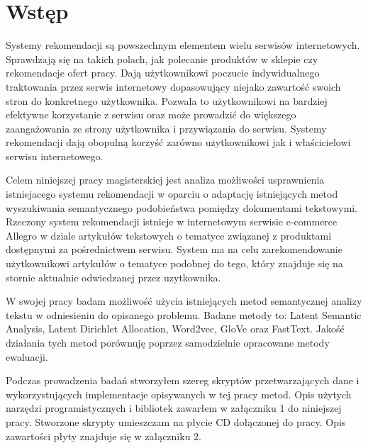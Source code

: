 \documentclass[pl]{minipw} %
\begin{document}
\makestatement


\cleardoublepage
\tableofcontents


\cleardoublepage
\pagestyle{fancy}

\chapter*{Wstęp}
Systemy rekomendacji są powszechnym elementem wielu serwisów internetowych. Sprawdzają się na takich polach, jak polecanie produktów w sklepie czy rekomendacje ofert pracy. Dają użytkownikowi poczucie indywidualnego traktowania przez serwis internetowy dopasowujący niejako zawartość swoich stron do konkretnego użytkownika. Pozwala to użytkownikowi na bardziej efektywne korzystanie z serwisu oraz może prowadzić do większego zaangażowania ze strony użytkownika i przywiązania do serwisu. Systemy rekomendacji dają obopulną korzyść zarówno użytkownikowi jak i właścicielowi serwisu internetowego.

Celem niniejszej pracy magisterskiej jest analiza możliwości usprawnienia istniejacego systemu rekomendacji w oparciu o adaptację istniejących metod wyszukiwania semantycznego podobieństwa pomiędzy dokumentami tekstowymi. Rzeczony system rekomendacji istnieje w internetowym serwisie e-commerce Allegro w dziale artykułów tekstowych o tematyce związanej z produktami dostępnymi za pośrednictwem serwisu. System ma na celu zarekomendowanie użytkownikowi artykułów o tematyce podobnej do tego, który znajduje się na stornie aktualnie odwiedzanej przez uzytkownika.

W swojej pracy badam możliwość użycia istniejących metod semantycznej analizy tekstu w odniesieniu do opisanego problemu. Badane metody to: Latent Semantic Analysis, Latent Dirichlet Allocation, Word2vec, GloVe oraz FastText. Jakość działania tych metod porównuję poprzez samodzielnie opracowane metody ewaluacji.

Podczas prowadzenia badań stworzyłem szereg skryptów przetwarzających dane i wykorzystujących implementacje opisywanych w tej pracy metod. Opis użytych narzędzi programistycznych i bibliotek zawarłem w załączniku 1 do niniejszej pracy. Stworzone skrypty umieszczam na płycie CD dołączonej do pracy. Opis zawartości płyty znajduje się w załączniku 2.
\end{document}
